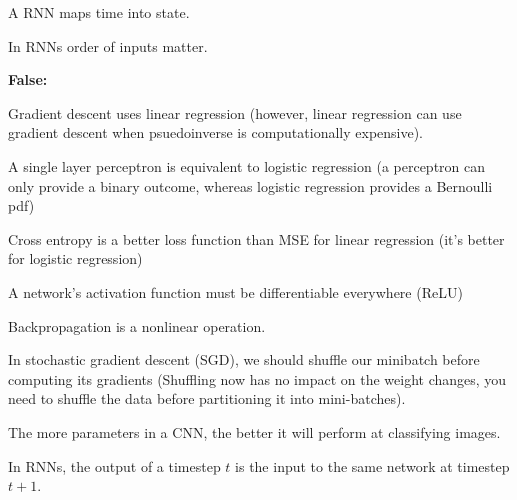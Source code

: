 A RNN maps time into state.

In RNNs order of inputs matter.

\textbf{False:}

Gradient descent uses linear regression (however, linear regression can use gradient descent when psuedoinverse is computationally expensive).

A single layer perceptron is equivalent to logistic regression (a perceptron can only provide a binary outcome, whereas logistic regression provides a Bernoulli pdf)

Cross entropy is a better loss function than MSE for linear regression (it's better for logistic regression)

A network’s activation function must be differentiable everywhere (ReLU)

Backpropagation is a nonlinear operation.

In stochastic gradient descent (SGD), we should shuffle our minibatch before computing its gradients (Shuffling now has no impact on the weight changes, you need to shuffle the data before partitioning it into mini-batches).

The more parameters in a CNN, the better it will perform at classifying images.

In RNNs, the output of a timestep $t$ is the input to the same network at timestep $t + 1$.
